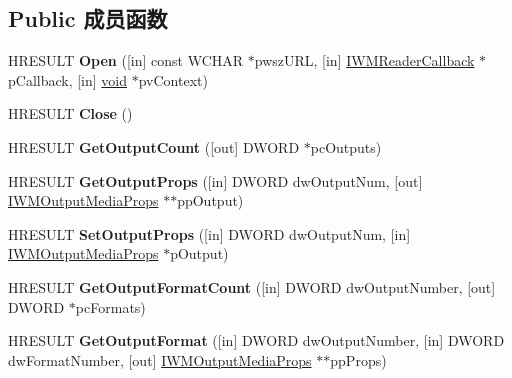 \subsection*{Public 成员函数}
\begin{DoxyCompactItemize}
\item 
\mbox{\label{interface_i_w_m_reader_a60b9c310fa71c6734458a9288348cb66}} 
H\+R\+E\+S\+U\+LT {\bfseries Open} (\mbox{[}in\mbox{]} const W\+C\+H\+AR $\ast$pwsz\+U\+RL, \mbox{[}in\mbox{]} \hyperlink{interface_i_w_m_reader_callback}{I\+W\+M\+Reader\+Callback} $\ast$p\+Callback, \mbox{[}in\mbox{]} \hyperlink{interfacevoid}{void} $\ast$pv\+Context)
\item 
\mbox{\label{interface_i_w_m_reader_ac2064f0daedb0110cd54a9227b2cfeb8}} 
H\+R\+E\+S\+U\+LT {\bfseries Close} ()
\item 
\mbox{\label{interface_i_w_m_reader_accd2dfff75d78a643fb4ebfa1907a3af}} 
H\+R\+E\+S\+U\+LT {\bfseries Get\+Output\+Count} (\mbox{[}out\mbox{]} D\+W\+O\+RD $\ast$pc\+Outputs)
\item 
\mbox{\label{interface_i_w_m_reader_aa624a486e15542ab49735d09da9933ad}} 
H\+R\+E\+S\+U\+LT {\bfseries Get\+Output\+Props} (\mbox{[}in\mbox{]} D\+W\+O\+RD dw\+Output\+Num, \mbox{[}out\mbox{]} \hyperlink{interface_i_w_m_output_media_props}{I\+W\+M\+Output\+Media\+Props} $\ast$$\ast$pp\+Output)
\item 
\mbox{\label{interface_i_w_m_reader_ad9492fbc2a164484c4b7b063a9263115}} 
H\+R\+E\+S\+U\+LT {\bfseries Set\+Output\+Props} (\mbox{[}in\mbox{]} D\+W\+O\+RD dw\+Output\+Num, \mbox{[}in\mbox{]} \hyperlink{interface_i_w_m_output_media_props}{I\+W\+M\+Output\+Media\+Props} $\ast$p\+Output)
\item 
\mbox{\label{interface_i_w_m_reader_a3bc7483e5af9769c1ebdeb4a9df31d06}} 
H\+R\+E\+S\+U\+LT {\bfseries Get\+Output\+Format\+Count} (\mbox{[}in\mbox{]} D\+W\+O\+RD dw\+Output\+Number, \mbox{[}out\mbox{]} D\+W\+O\+RD $\ast$pc\+Formats)
\item 
\mbox{\label{interface_i_w_m_reader_ac19ba27d16ef6937d36b663fc3c33369}} 
H\+R\+E\+S\+U\+LT {\bfseries Get\+Output\+Format} (\mbox{[}in\mbox{]} D\+W\+O\+RD dw\+Output\+Number, \mbox{[}in\mbox{]} D\+W\+O\+RD dw\+Format\+Number, \mbox{[}out\mbox{]} \hyperlink{interface_i_w_m_output_media_props}{I\+W\+M\+Output\+Media\+Props} $\ast$$\ast$pp\+Props)

\end{DoxyCompactItemize}
